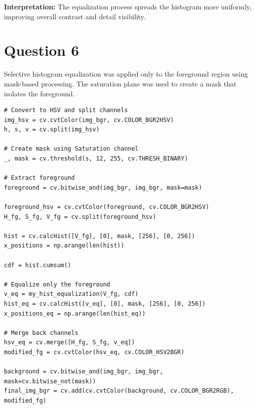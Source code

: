 \documentclass[10pt,a4paper]{article}
\begin{document}
\textbf{Interpretation:} The equalization process spreads the histogram more uniformly, improving overall contrast and detail visibility.

\section{Question 6}
Selective histogram equalization was applied only to the foreground region using mask-based processing. The saturation plane was used to create a mask that isolates the foreground.

\begin{lstlisting}[caption=Foreground histogram equalization]
# Convert to HSV and split channels
img_hsv = cv.cvtColor(img_bgr, cv.COLOR_BGR2HSV)
h, s, v = cv.split(img_hsv)

# Create mask using Saturation channel
_, mask = cv.threshold(s, 12, 255, cv.THRESH_BINARY)

# Extract foreground
foreground = cv.bitwise_and(img_bgr, img_bgr, mask=mask)

foreground_hsv = cv.cvtColor(foreground, cv.COLOR_BGR2HSV)
H_fg, S_fg, V_fg = cv.split(foreground_hsv)

hist = cv.calcHist([V_fg], [0], mask, [256], [0, 256])
x_positions = np.arange(len(hist))

cdf = hist.cumsum()

# Equalize only the foreground
v_eq = my_hist_equalization(V_fg, cdf)
hist_eq = cv.calcHist([v_eq], [0], mask, [256], [0, 256])
x_positions_eq = np.arange(len(hist_eq))

# Merge back channels
hsv_eq = cv.merge([H_fg, S_fg, v_eq])
modified_fg = cv.cvtColor(hsv_eq, cv.COLOR_HSV2BGR)

background = cv.bitwise_and(img_bgr, img_bgr, mask=cv.bitwise_not(mask))
final_img_bgr = cv.add(cv.cvtColor(background, cv.COLOR_BGR2RGB), modified_fg)
\end{lstlisting}
\end{document}
